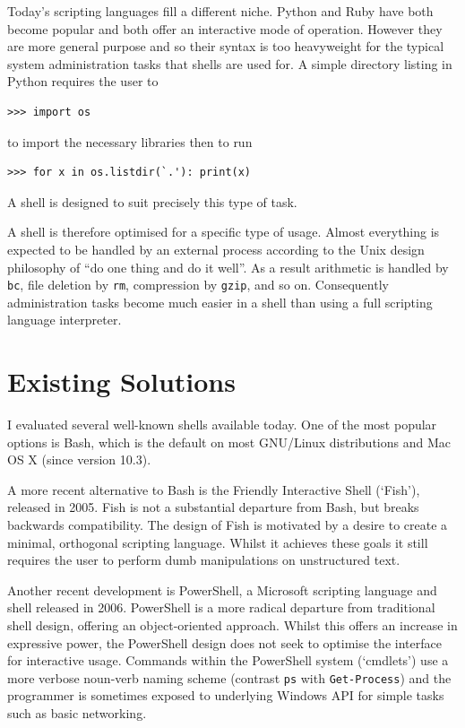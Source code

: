 \documentclass[12pt,twoside,notitlepage]{report}
\begin{document}
Today's scripting languages fill a different niche. Python and Ruby
have both become popular and both offer an interactive mode of
operation. However they are more general purpose and so their syntax
is too heavyweight for the typical system administration tasks that
shells are used for. A simple directory listing in Python requires the
user to 

\begin{verbatim}
>>> import os
\end{verbatim}

\noindent
to import the necessary libraries then to run

\begin{verbatim}
>>> for x in os.listdir(`.'): print(x)
\end{verbatim}

\noindent
A shell is designed to suit precisely this type of task.

A shell is therefore optimised for a specific type of usage. Almost
everything is expected to be handled by an external process according
to the Unix design philosophy of ``do one thing and do it well''. As a
result arithmetic is handled by {\tt bc}, file deletion by {\tt rm},
compression by {\tt gzip}, and so on. Consequently administration
tasks become much easier in a shell than using a full scripting
language interpreter.

\section{Existing Solutions}
I evaluated several well-known shells available today. One of the most popular
options is Bash, which is the default on most GNU/Linux distributions
and Mac OS X (since version 10.3).

A more recent alternative to Bash is the Friendly Interactive Shell
(`Fish'), released in 2005. Fish is not a substantial departure from
Bash, but breaks backwards compatibility. The design of Fish
\cite{fishdesign} is motivated by a desire to create a minimal,
orthogonal scripting language. Whilst it achieves these goals it still
requires the user to perform dumb manipulations on unstructured text.

Another recent development is PowerShell, a Microsoft scripting
language and shell released in 2006. PowerShell is a more radical
departure from traditional shell design, offering an object-oriented
approach. Whilst this offers an increase in expressive power, the
PowerShell design does not seek to optimise the interface for
interactive usage. Commands within the PowerShell system (`cmdlets')
use a more verbose noun-verb naming scheme (contrast {\tt ps} with
{\tt Get-Process}) and the programmer is sometimes exposed to
underlying Windows API for simple tasks such as basic networking.
\end{document}
